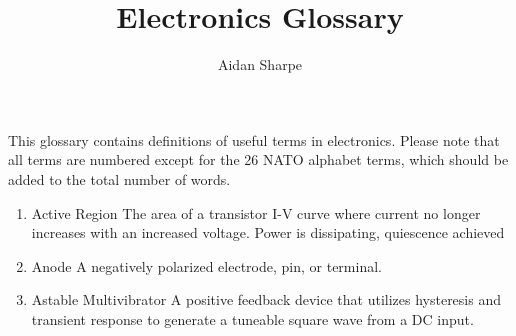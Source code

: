 \documentclass{IEEEtran}
\title{Electronics Glossary}
\author{Aidan Sharpe}
\begin{document}
\maketitle

This glossary contains definitions of useful terms in electronics. Please note that all terms are numbered except for the 26 NATO alphabet terms, which should be added to the total number of words.

\begin{enumerate}
\item Active Region
  \subitem The area of a transistor I-V curve where current no longer increases with an increased voltage. Power is dissipating, quiescence achieved \\
\item Anode
  \subitem A negatively polarized electrode, pin, or terminal.\\
\item Astable Multivibrator
  \subitem A positive feedback device that utilizes hysteresis and transient response to generate a tuneable square wave from a DC input. \\


\end{enumerate}
\end{document}
